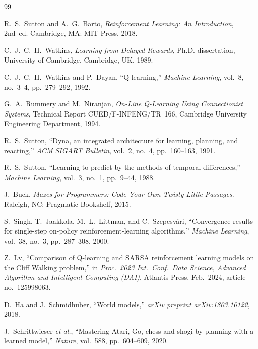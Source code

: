 \documentclass[11pt]{article}
\begin{document}
\begin{thebibliography}{99}

R.~S.~Sutton and A.~G.~Barto, \emph{Reinforcement Learning: An
Introduction}, 2nd~ed. Cambridge, MA: MIT Press, 2018.

C.~J.~C.~H.~Watkins, \emph{Learning from Delayed Rewards}, Ph.D.
dissertation, University of Cambridge, Cambridge, UK, 1989.

C.~J.~C.~H.~Watkins and P.~Dayan, ``Q-learning,'' \emph{Machine
Learning}, vol.~8, no.~3--4, pp.~279--292, 1992.

G.~A.~Rummery and M.~Niranjan, \emph{On-Line Q-Learning Using
Connectionist Systems}, Technical Report CUED/F-INFENG/TR~166,
Cambridge University Engineering Department, 1994.

R.~S.~Sutton, ``Dyna, an integrated architecture for learning, planning,
and reacting,'' \emph{ACM SIGART Bulletin}, vol.~2, no.~4,
pp.~160--163, 1991.

R.~S.~Sutton, ``Learning to predict by the methods of temporal
differences,'' \emph{Machine Learning}, vol.~3, no.~1, pp.~9--44,
1988.

J.~Buck, \emph{Mazes for Programmers: Code Your Own Twisty Little
Passages}. Raleigh, NC: Pragmatic Bookshelf, 2015.

S.~Singh, T.~Jaakkola, M.~L.~Littman, and C.~Szepesv\'{a}ri,
``Convergence results for single-step on-policy
reinforcement-learning algorithms,'' \emph{Machine Learning}, vol.~38,
no.~3, pp.~287--308, 2000.

Z.~Lv, ``Comparison of Q-learning and SARSA reinforcement learning models
on the Cliff Walking problem,'' in \emph{Proc.\ 2023 Int.\ Conf.\ Data
Science, Advanced Algorithm and Intelligent Computing (DAI)},
Atlantis Press, Feb.\ 2024, article no.~125998063.

D.~Ha and J.~Schmidhuber, ``World models,'' \emph{arXiv preprint
arXiv:1803.10122}, 2018.

J.~Schrittwieser \emph{et al.}, ``Mastering Atari, Go, chess and shogi
by planning with a learned model,'' \emph{Nature}, vol.~588,
pp.~604--609, 2020.

\end{thebibliography}
\end{document}

